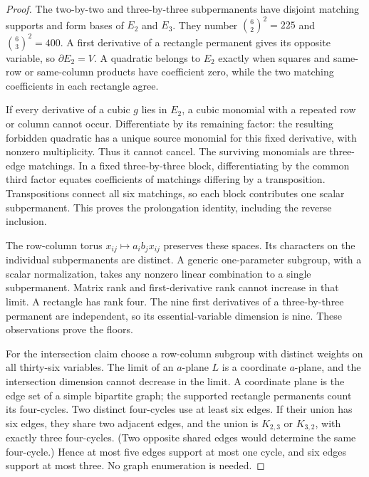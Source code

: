 \documentclass[11pt]{amsart}
\theoremstyle{remark}\newtheorem{remark}[theorem]{Remark}
\numberwithin{equation}{section}
\newcommand{\dd}{\partial}
\begin{document}
\begin{proof}
The two-by-two and three-by-three subpermanents have disjoint matching
supports and form bases of $E_2$ and $E_3$. They number
$\binom62^2=225$ and $\binom63^2=400$. A first derivative of a rectangle
permanent gives its opposite variable, so $\dd E_2=V$.
A quadratic belongs to $E_2$ exactly when squares and same-row or
same-column products have coefficient zero, while the two matching
coefficients in each rectangle agree.

If every derivative of a cubic $g$ lies in $E_2$, a cubic monomial with a
repeated row or column cannot occur. Differentiate by its remaining factor:
the resulting forbidden quadratic has a unique source monomial for this
fixed derivative, with nonzero multiplicity. Thus it cannot cancel.
The surviving monomials are three-edge matchings. In a fixed three-by-three
block, differentiating by the common third factor equates coefficients of
matchings differing by a transposition. Transpositions connect all six
matchings, so each block contributes one scalar subpermanent. This proves
the prolongation identity, including the reverse inclusion.

The row-column torus $x_{ij}\mapsto a_i b_j x_{ij}$ preserves these spaces.
Its characters on the individual subpermanents are distinct. A generic
one-parameter subgroup, with a scalar normalization, takes any nonzero
linear combination to a single subpermanent. Matrix rank and first-derivative
rank cannot increase in that limit. A rectangle has rank four. The nine
first derivatives of a three-by-three permanent are independent, so its
essential-variable dimension is nine. These observations prove the floors.

For the intersection claim choose a row-column subgroup with distinct
weights on all thirty-six variables. The limit of an $a$-plane $L$ is a
coordinate $a$-plane, and the intersection dimension cannot decrease in
the limit. A coordinate plane is the edge set of a simple bipartite graph;
the supported rectangle permanents count its four-cycles. Two distinct
four-cycles use at least six edges. If their union has six edges, they share
two adjacent edges, and the union is $K_{2,3}$ or $K_{3,2}$, with exactly
three four-cycles. (Two opposite shared edges would determine the same
four-cycle.) Hence at most five edges support at most one cycle, and six
edges support at most three. No graph enumeration is needed.
\end{proof}
\end{document}
